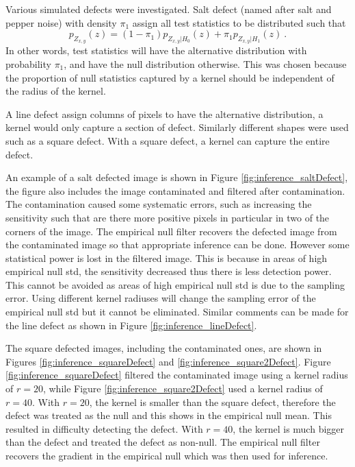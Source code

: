 Various simulated defects were investigated. Salt defect (named after salt and pepper noise) with density $\pi_1$ assign all test statistics to be distributed such that
\begin{equation}
	p_{Z_{x,y}}(z)=(1-\pi_1)p_{Z_{x,y}|H_0}(z) + \pi_1 p_{Z_{x,y}|H_1}(z) \ .
\end{equation}
In other words, test statistics will have the alternative distribution with probability $\pi_1$, and have the null distribution otherwise. This was chosen because the proportion of null statistics captured by a kernel should be independent of the radius of the kernel.

A line defect assign columns of pixels to have the alternative distribution, a kernel would only capture a section of defect. Similarly different shapes were used such as a square defect. With a square defect, a kernel can capture the entire defect.

An example of a salt defected image is shown in Figure \ref{fig:inference_saltDefect}, the figure also includes the image contaminated and filtered after contamination. The contamination caused some systematic errors, such as increasing the sensitivity such that are there more positive pixels in particular in two of the corners of the image. The empirical null filter recovers the defected image from the contaminated image so that appropriate inference can be done. However some statistical power is lost in the filtered image. This is because in areas of high empirical null std, the sensitivity decreased thus there is less detection power. This cannot be avoided as areas of high empirical null std is due to the sampling error. Using different kernel radiuses will change the sampling error of the empirical null std but it cannot be eliminated. Similar comments can be made for the line defect as shown in Figure \ref{fig:inference_lineDefect}.

The square defected images, including the contaminated ones, are shown in Figures \ref{fig:inference_squareDefect} and \ref{fig:inference_square2Defect}. Figure \ref{fig:inference_squareDefect} filtered the contaminated image using a kernel radius of $r=20$, while Figure \ref{fig:inference_square2Defect} used a kernel radius of $r=40$. With $r=20$, the kernel is smaller than the square defect, therefore the defect was treated as the null and this shows in the empirical null mean. This resulted in difficulty detecting the defect. With $r=40$, the kernel is much bigger than the defect and treated the defect as non-null. The empirical null filter recovers the gradient in the empirical null which was then used for inference.

